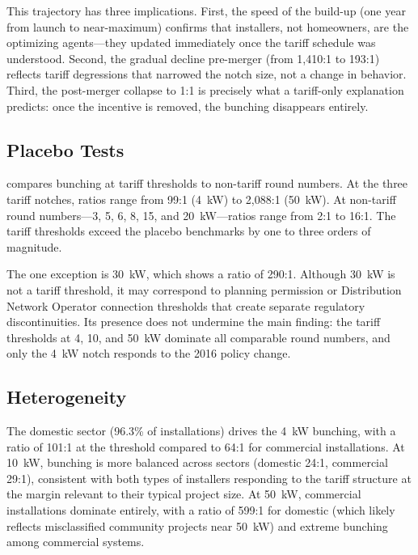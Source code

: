 \documentclass[12pt]{article}
\begin{document}
This trajectory has three implications. First, the speed of the build-up (one year from launch to near-maximum) confirms that installers, not homeowners, are the optimizing agents---they updated immediately once the tariff schedule was understood. Second, the gradual decline pre-merger (from 1,410:1 to 193:1) reflects tariff degressions that narrowed the notch size, not a change in behavior. Third, the post-merger collapse to 1:1 is precisely what a tariff-only explanation predicts: once the incentive is removed, the bunching disappears entirely.

\subsection{Placebo Tests}



 compares bunching at tariff thresholds to non-tariff round numbers. At the three tariff notches, ratios range from 99:1 (4~kW) to 2,088:1 (50~kW). At non-tariff round numbers---3, 5, 6, 8, 15, and 20~kW---ratios range from 2:1 to 16:1. The tariff thresholds exceed the placebo benchmarks by one to three orders of magnitude.

The one exception is 30~kW, which shows a ratio of 290:1. Although 30~kW is not a tariff threshold, it may correspond to planning permission or Distribution Network Operator connection thresholds that create separate regulatory discontinuities. Its presence does not undermine the main finding: the tariff thresholds at 4, 10, and 50~kW dominate all comparable round numbers, and only the 4~kW notch responds to the 2016 policy change.

\subsection{Heterogeneity}

The domestic sector (96.3\% of installations) drives the 4~kW bunching, with a ratio of 101:1 at the threshold compared to 64:1 for commercial installations. At 10~kW, bunching is more balanced across sectors (domestic 24:1, commercial 29:1), consistent with both types of installers responding to the tariff structure at the margin relevant to their typical project size. At 50~kW, commercial installations dominate entirely, with a ratio of 599:1 for domestic (which likely reflects misclassified community projects near 50~kW) and extreme bunching among commercial systems.
\end{document}
